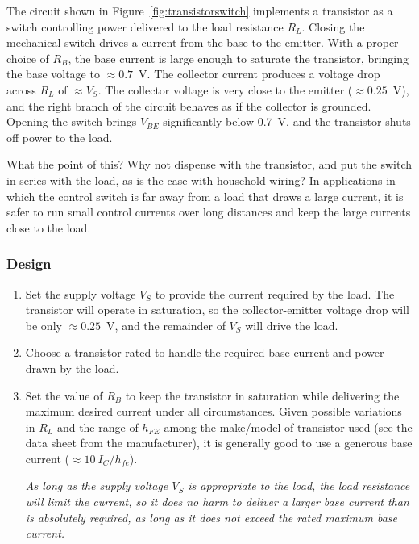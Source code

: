 \documentclass[11pt]{article}
\begin{document}
The circuit shown in Figure~\ref{fig:transistorswitch} implements a
transistor as a switch controlling power delivered to the load
resistance $R_L$.  Closing the mechanical switch drives a current from
the base to the emitter.  With a proper choice of $R_B$, the base
current is large enough to saturate the transistor, bringing the base
voltage to $\approx0.7$~V.  The collector current produces a voltage
drop across $R_L$ of $\approx V_S$. The collector voltage is very close to
the emitter ($\approx 0.25$~V), and the right branch of the circuit
behaves as if the collector is grounded. Opening the switch
brings $V_{BE}$ significantly below 0.7~V, and the transistor shuts
off power to the load.

What the point of this? Why not dispense with the transistor, and put
the switch in series with the load, as is the case with household
wiring? In applications in which the control switch is far away from a
load that draws a large current, it is safer to run small 
control currents over long distances and keep the large currents close
to the load.

\subsubsection*{Design}

\begin{enumerate}
\item Set the supply voltage $V_S$ to provide the current required by
  the load. The transistor will operate in saturation, so the
  collector-emitter voltage drop will be only $\approx 0.25$~V, and
  the remainder of $V_S$ will drive the load.

\item Choose a transistor rated to handle the required base current
  and power drawn by the load.
  
\item Set the value of $R_B$ to keep the transistor in saturation
  while delivering the maximum desired current under all
  circumstances. Given possible variations in $R_L$ and the range
  of $h_{FE}$ among the make/model of transistor used (see the data
  sheet from the manufacturer), it is generally good to use a generous
  base current ($\approx 10~I_C/h_{fe}$).

  \emph{As long as the supply voltage $V_S$ is appropriate to the
    load, the load resistance will limit the current, so it does no
    harm to deliver a larger base current than is absolutely required,
    as long as it does not exceed the rated maximum base current.}
\end{enumerate}
\end{document}
